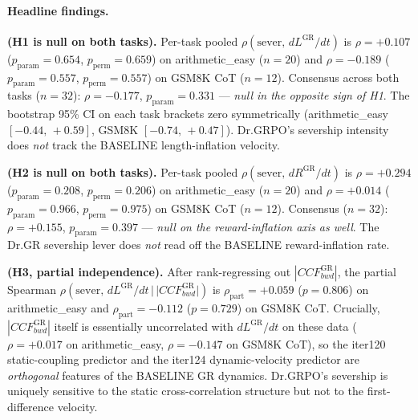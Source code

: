 \paragraph{Headline findings.}
\textbf{(H1 is null on both tasks).}  Per-task pooled
$\rho(\mathrm{sever},\,dL^{\mathrm{GR}}/dt)$ is $\rho{=}+0.107$
($p_{\mathrm{param}}{=}0.654$, $p_{\mathrm{perm}}{=}0.659$)
on arithmetic\_easy ($n{=}20$) and $\rho{=}-0.189$
($p_{\mathrm{param}}{=}0.557$, $p_{\mathrm{perm}}{=}0.557$)
on GSM8K CoT ($n{=}12$).  Consensus across both tasks
($n{=}32$): $\rho{=}-0.177$, $p_{\mathrm{param}}{=}0.331$ ---
\emph{null in the opposite sign of H1}.  The bootstrap 95\% CI
on each task brackets zero symmetrically
(arithmetic\_easy $[-0.44,\,+0.59]$, GSM8K $[-0.74,\,+0.47]$).
Dr.GRPO's severship intensity does \emph{not} track the BASELINE
length-inflation velocity.

\textbf{(H2 is null on both tasks).}  Per-task pooled
$\rho(\mathrm{sever},\,dR^{\mathrm{GR}}/dt)$ is $\rho{=}+0.294$
($p_{\mathrm{param}}{=}0.208$, $p_{\mathrm{perm}}{=}0.206$)
on arithmetic\_easy ($n{=}20$) and $\rho{=}+0.014$
($p_{\mathrm{param}}{=}0.966$, $p_{\mathrm{perm}}{=}0.975$)
on GSM8K CoT ($n{=}12$).  Consensus ($n{=}32$):
$\rho{=}+0.155$, $p_{\mathrm{param}}{=}0.397$ --- \emph{null on
the reward-inflation axis as well}.  The Dr.GR severship lever
does \emph{not} read off the BASELINE reward-inflation rate.

\textbf{(H3, partial independence).}  After rank-regressing out
$|CCF_{bwd}^{\mathrm{GR}}|$, the partial Spearman
$\rho(\mathrm{sever},\,dL^{\mathrm{GR}}/dt\,|\,|CCF_{bwd}^{\mathrm{GR}}|)$
is $\rho_{\mathrm{part}}{=}+0.059$ ($p{=}0.806$) on
arithmetic\_easy and $\rho_{\mathrm{part}}{=}-0.112$ ($p{=}0.729$)
on GSM8K CoT.  Crucially, $|CCF_{bwd}^{\mathrm{GR}}|$ itself is
essentially uncorrelated with $dL^{\mathrm{GR}}/dt$ on these data
($\rho{=}+0.017$ on arithmetic\_easy, $\rho{=}-0.147$ on GSM8K
CoT), so the iter120 static-coupling predictor and the iter124
dynamic-velocity predictor are \emph{orthogonal} features of the
BASELINE GR dynamics.  Dr.GRPO's severship is uniquely sensitive
to the static cross-correlation structure but not to the
first-difference velocity.

